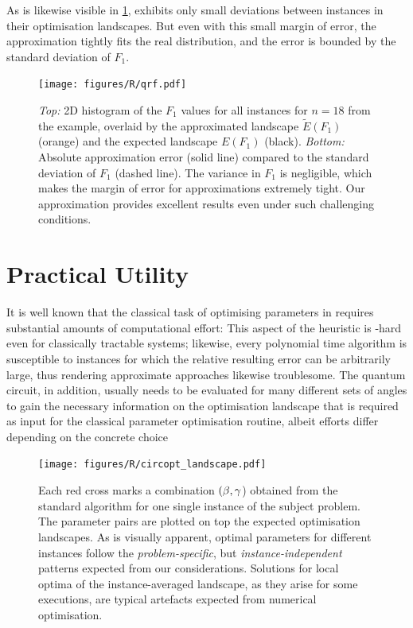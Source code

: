 As is likewise visible in \cref{fig:qr_factoring_n18}, \qrfactoring exhibits only small  deviations between instances in their optimisation landscapes. But even with this small margin of error, the approximation tightly fits the real distribution, and the error is bounded by the standard deviation of $F_1$.

\begin{figure}[htbp]
    \texttt{[image: figures/R/qrf.pdf]}
    \caption{\emph{Top:} 2D histogram of the $F_1$ values for all instances for \(n=18\) from the \qrfactoring example, overlaid by  the approximated landscape $\tilde{E}(F_1)$  (orange) and the expected landscape \(E(F_{1})\)  (black). \emph{Bottom:} Absolute approximation error (solid line) compared to the standard deviation of $F_1$ (dashed line). The variance in $F_1$ is negligible, which makes the margin of error for approximations extremely tight. Our approximation provides excellent results even under such challenging conditions.}
    \label{fig:qr_factoring_n18}
\end{figure}

\section{Practical Utility}\label{sec:utility}
It is well known that the classical task of optimising parameters in \QAOA requires substantial amounts of computational effort: This aspect of the heuristic is \NP-hard~\cite{bittel_training_2021} even for classically tractable systems; likewise, every polynomial time algorithm is susceptible to instances for which the relative resulting error can be arbitrarily large, thus rendering approximate approaches likewise troublesome. The \QAOA quantum circuit, in addition, usually needs to be evaluated for many different sets of angles to gain the necessary information on the optimisation landscape that is required as input for the classical parameter optimisation routine, albeit efforts differ depending on the concrete choice~\cite{Periyasamy:2024,Thelen:2024,Singhal:2024}

\begin{figure}[htbp]
    \centering
    \texttt{[image: figures/R/circopt\_landscape.pdf]}\vspace*{-1em}
   \caption{Each red cross marks a combination \((\beta, \gamma\)) obtained 
   from the standard \QAOA algorithm for one single instance of the 
   subject problem. The parameter pairs are plotted on top the expected optimisation landscapes. As is visually apparent, optimal parameters for 
   different instances follow the \emph{problem-specific}, but \emph{instance-independent} patterns 
   expected from our considerations. Solutions for local optima
   of the instance-averaged landscape, as they arise for some \QAOA 
   executions, are typical artefacts expected from numerical 
   optimisation.}\label{fig:circopt_landscape}
\end{figure}

